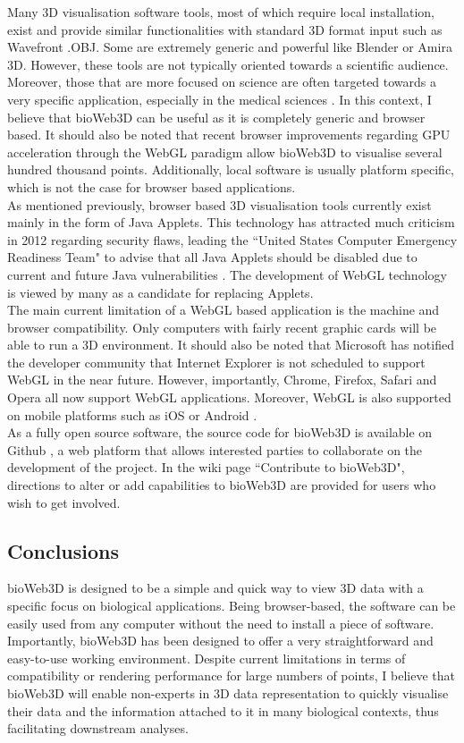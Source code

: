 Many 3D visualisation software tools, most of which require local installation, exist and provide similar functionalities with standard 3D format input such as Wavefront .OBJ. Some are extremely generic and powerful like Blender or Amira 3D. However, these tools are not typically oriented towards a scientific audience. Moreover, those that are more focused on science are often targeted towards a very specific application, especially in the medical sciences \cite{Wang093D}. In this context, I believe that bioWeb3D can be useful as it is completely generic and browser based. It should also be noted that recent browser improvements regarding GPU acceleration through the WebGL paradigm allow bioWeb3D to visualise several hundred thousand points. Additionally, local software is usually platform specific, which is not the case for browser based applications.\\

As mentioned previously, browser based 3D visualisation tools currently exist mainly in the form of Java Applets. This technology has attracted much criticism in 2012 regarding security flaws, leading the ``United States Computer Emergency Readiness Team" to advise that all Java Applets should be disabled due to current and future Java vulnerabilities \cite{security}. The development of WebGL technology is viewed by many as a candidate for replacing Applets. \\


The main current limitation of a WebGL based application is the machine and browser compatibility. Only computers with fairly recent graphic cards will be able to run a 3D environment. It should also be noted that Microsoft has notified the developer community that Internet Explorer is not scheduled to support WebGL in the near future. However, importantly, Chrome, Firefox, Safari and Opera all now support WebGL applications. Moreover, WebGL is also supported on mobile platforms such as iOS or Android \cite{caniuse}.\\


As a fully open source software, the source code for bioWeb3D is available on Github \cite{github}, a web platform that allows interested parties to collaborate on the development of the project. In the wiki page ``Contribute to bioWeb3D", directions to alter or add capabilities to bioWeb3D are provided for users who wish to get involved.

	\subsection{Conclusions}
bioWeb3D is designed to be a simple and quick way to view 3D data with a specific focus on biological applications.  Being browser-based, the software can be easily used from any computer without the need to install a piece of software. Importantly, bioWeb3D has been designed to offer a very straightforward and easy-to-use working environment. Despite current limitations in terms of compatibility or rendering performance for large numbers of points, I believe that bioWeb3D will enable non-experts in 3D data representation to quickly visualise their data and the information attached to it in many biological contexts, thus facilitating downstream analyses.

